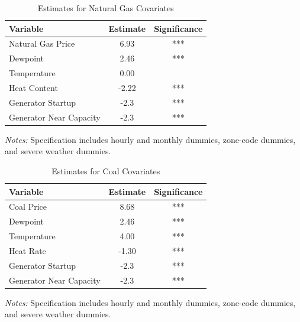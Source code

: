 \documentclass[12pt]{article}
\begin{document}
\begin{table}[htbp]
\centering
\begin{tabular}{lcc}
\toprule
\textbf{Variable} & \textbf{Estimate} & \textbf{Significance} \\
\midrule
Natural Gas Price & 6.93 & *** \\
Dewpoint               & 2.46 & *** \\
Temperature            & 0.00 &     \\
Heat Content              & -2.22& *** \\
Generator Startup              & -2.3& *** \\
 Generator Near Capacity             & -2.3& *** \\
\bottomrule
\end{tabular}
\vspace{0.5em}

\footnotesize\textit{Notes:} Specification includes hourly and monthly dummies, zone-code dummies, and severe weather dummies.
\caption{Estimates for Natural Gas Covariates}
\label{NaturalGasTable}
\end{table}

\begin{table}[htbp]
\centering
\begin{tabular}{lcc}
\toprule
\textbf{Variable} & \textbf{Estimate} & \textbf{Significance} \\
\midrule
Coal Price     & 8.68  & *** \\
Dewpoint       & 2.46  & *** \\
Temperature    & 4.00  & *** \\
Heat Rate      & -1.30 & *** \\
Generator Startup              & -2.3& *** \\
 Generator Near Capacity             & -2.3& *** \\
\bottomrule
\end{tabular}
\vspace{0.5em}

\footnotesize\textit{Notes:} Specification includes hourly and monthly dummies, zone-code dummies, and severe weather dummies.
\caption{Estimates for Coal Covariates}
\label{CoalTable}
\end{table}
\end{document}
